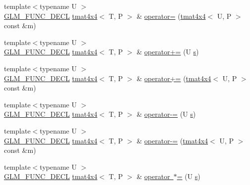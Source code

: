 \begin{DoxyCompactItemize}
\item 
{\footnotesize template$<$typename U $>$ }\\\mbox{\hyperlink{setup_8hpp_ab2d052de21a70539923e9bcbf6e83a51}{G\+L\+M\+\_\+\+F\+U\+N\+C\+\_\+\+D\+E\+CL}} \mbox{\hyperlink{structglm_1_1tmat4x4}{tmat4x4}}$<$ T, P $>$ \& \mbox{\hyperlink{structglm_1_1tmat4x4_af78f51e2bde3b85554c4f48bcca0cbf6}{operator=}} (\mbox{\hyperlink{structglm_1_1tmat4x4}{tmat4x4}}$<$ U, P $>$ const \&m)
\item 
{\footnotesize template$<$typename U $>$ }\\\mbox{\hyperlink{setup_8hpp_ab2d052de21a70539923e9bcbf6e83a51}{G\+L\+M\+\_\+\+F\+U\+N\+C\+\_\+\+D\+E\+CL}} \mbox{\hyperlink{structglm_1_1tmat4x4}{tmat4x4}}$<$ T, P $>$ \& \mbox{\hyperlink{structglm_1_1tmat4x4_abc9e0d2f169a0a1040aafb8a8df0d4e7}{operator+=}} (U \mbox{\hyperlink{glad_8h_af1b1d5edfea6a34daee7389b1b5810ad}{s}})
\item 
{\footnotesize template$<$typename U $>$ }\\\mbox{\hyperlink{setup_8hpp_ab2d052de21a70539923e9bcbf6e83a51}{G\+L\+M\+\_\+\+F\+U\+N\+C\+\_\+\+D\+E\+CL}} \mbox{\hyperlink{structglm_1_1tmat4x4}{tmat4x4}}$<$ T, P $>$ \& \mbox{\hyperlink{structglm_1_1tmat4x4_a64f3faf32fe23ebc92896ccf2199c372}{operator+=}} (\mbox{\hyperlink{structglm_1_1tmat4x4}{tmat4x4}}$<$ U, P $>$ const \&m)
\item 
{\footnotesize template$<$typename U $>$ }\\\mbox{\hyperlink{setup_8hpp_ab2d052de21a70539923e9bcbf6e83a51}{G\+L\+M\+\_\+\+F\+U\+N\+C\+\_\+\+D\+E\+CL}} \mbox{\hyperlink{structglm_1_1tmat4x4}{tmat4x4}}$<$ T, P $>$ \& \mbox{\hyperlink{structglm_1_1tmat4x4_a2b6efc926899fe1c11355d187eec5d29}{operator-\/=}} (U \mbox{\hyperlink{glad_8h_af1b1d5edfea6a34daee7389b1b5810ad}{s}})
\item 
{\footnotesize template$<$typename U $>$ }\\\mbox{\hyperlink{setup_8hpp_ab2d052de21a70539923e9bcbf6e83a51}{G\+L\+M\+\_\+\+F\+U\+N\+C\+\_\+\+D\+E\+CL}} \mbox{\hyperlink{structglm_1_1tmat4x4}{tmat4x4}}$<$ T, P $>$ \& \mbox{\hyperlink{structglm_1_1tmat4x4_aa8385af8ad2d167f4111ab6346e4fd00}{operator-\/=}} (\mbox{\hyperlink{structglm_1_1tmat4x4}{tmat4x4}}$<$ U, P $>$ const \&m)
\item 
{\footnotesize template$<$typename U $>$ }\\\mbox{\hyperlink{setup_8hpp_ab2d052de21a70539923e9bcbf6e83a51}{G\+L\+M\+\_\+\+F\+U\+N\+C\+\_\+\+D\+E\+CL}} \mbox{\hyperlink{structglm_1_1tmat4x4}{tmat4x4}}$<$ T, P $>$ \& \mbox{\hyperlink{structglm_1_1tmat4x4_a198306f38378478d6fcb4d2cad074a74}{operator $\ast$=}} (U \mbox{\hyperlink{glad_8h_af1b1d5edfea6a34daee7389b1b5810ad}{s}})

\end{DoxyCompactItemize}
